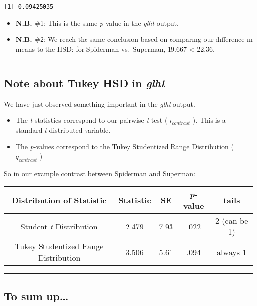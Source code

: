\documentclass[]{article}
\providecommand{\tightlist}{%
  \setlength{\itemsep}{0pt}\setlength{\parskip}{0pt}}
\begin{document}
\begin{verbatim}
[1] 0.09425035
\end{verbatim}

\begin{itemize}
\tightlist
\item
  \textbf{N.B.} \#1: This is the same \emph{p} value in the \emph{glht}
  output.
\item
  \textbf{N.B.} \#2: We reach the same conclusion based on comparing our
  difference in means to the HSD: for Spiderman vs.~Superman, 19.667
  \textless{} 22.36.
\end{itemize}

\begin{center}\rule{0.5\linewidth}{\linethickness}\end{center}

\hypertarget{note-about-tukey-hsd-in-glht}{%
\subsection{\texorpdfstring{Note about Tukey HSD in
\emph{glht}}{Note about Tukey HSD in glht}}\label{note-about-tukey-hsd-in-glht}}

We have just observed something important in the \emph{glht} output.

\begin{itemize}
\tightlist
\item
  The \emph{t} statistics correspond to our pairwise \emph{t} test (
  \(t_{contrast}\) ). This is a standard \emph{t} distributed variable.
\item
  The \emph{p}-values correspond to the Tukey Studentized Range
  Distribution ( \(q_{contrast}\) ).
\end{itemize}

So in our example contrast between Spiderman and Superman:

\begin{longtable}[]{@{}ccccc@{}}
\toprule
Distribution of Statistic & Statistic & SE & \emph{p}-value &
tails\tabularnewline
\midrule
\endhead
Student \emph{t} Distribution & 2.479 & 7.93 & .022 & 2 (can be
1)\tabularnewline
Tukey Studentized Range Distribution & 3.506 & 5.61 & .094 & always
1\tabularnewline
\bottomrule
\end{longtable}

\begin{center}\rule{0.5\linewidth}{\linethickness}\end{center}

\hypertarget{to-sum-up}{%
\subsection{To sum up\ldots{}}\label{to-sum-up}}
\end{document}
